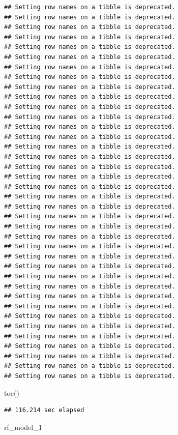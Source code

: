 \documentclass[
]{article}
\newenvironment{Shaded}{\begin{snugshade}}{\end{snugshade}}
\newcommand{\FunctionTok}[1]{\textcolor[rgb]{0.00,0.00,0.00}{#1}}
\newcommand{\NormalTok}[1]{#1}
\begin{document}
\begin{verbatim}
## Setting row names on a tibble is deprecated.
## Setting row names on a tibble is deprecated.
## Setting row names on a tibble is deprecated.
## Setting row names on a tibble is deprecated.
## Setting row names on a tibble is deprecated.
## Setting row names on a tibble is deprecated.
## Setting row names on a tibble is deprecated.
## Setting row names on a tibble is deprecated.
## Setting row names on a tibble is deprecated.
## Setting row names on a tibble is deprecated.
## Setting row names on a tibble is deprecated.
## Setting row names on a tibble is deprecated.
## Setting row names on a tibble is deprecated.
## Setting row names on a tibble is deprecated.
## Setting row names on a tibble is deprecated.
## Setting row names on a tibble is deprecated.
## Setting row names on a tibble is deprecated.
## Setting row names on a tibble is deprecated.
## Setting row names on a tibble is deprecated.
## Setting row names on a tibble is deprecated.
## Setting row names on a tibble is deprecated.
## Setting row names on a tibble is deprecated.
## Setting row names on a tibble is deprecated.
## Setting row names on a tibble is deprecated.
## Setting row names on a tibble is deprecated.
## Setting row names on a tibble is deprecated.
## Setting row names on a tibble is deprecated.
## Setting row names on a tibble is deprecated.
## Setting row names on a tibble is deprecated.
## Setting row names on a tibble is deprecated.
## Setting row names on a tibble is deprecated.
## Setting row names on a tibble is deprecated.
## Setting row names on a tibble is deprecated.
## Setting row names on a tibble is deprecated.
## Setting row names on a tibble is deprecated.
## Setting row names on a tibble is deprecated.
## Setting row names on a tibble is deprecated.
## Setting row names on a tibble is deprecated.
\end{verbatim}

\begin{Shaded}
\begin{Highlighting}[]
\FunctionTok{toc}\NormalTok{()}
\end{Highlighting}
\end{Shaded}

\begin{verbatim}
## 116.214 sec elapsed
\end{verbatim}

\begin{Shaded}
\begin{Highlighting}[]
\NormalTok{rf\_model\_1}
\end{Highlighting}
\end{Shaded}
\end{document}
